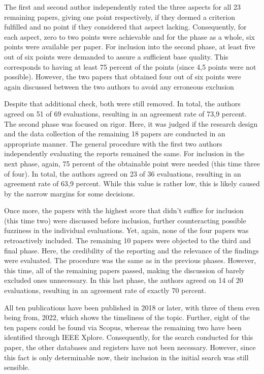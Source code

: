 \documentclass[conference]{IEEEtran}
\begin{document}
The first and second author independently rated the three aspects for all 23 remaining papers, giving one point respectively, if they deemed a criterion fulfilled and no point if they considered that aspect lacking. Consequently, for each aspect, zero to two points were achievable and for the phase as a whole, six points were available per paper. For inclusion into the second phase, at least five out of six points were demanded to assure a sufficient base quality. This corresponds to having at least 75 percent of the points (since 4,5 points were not possible). However, the two papers that obtained four out of six points were again discussed between the two authors to avoid any erroneous exclusion

Despite that additional check, both were still removed. In total, the authors agreed on 51 of 69 evaluations, resulting in an agreement rate of 73,9 percent. The second phase was focused on rigor. Here, it was judged if the research design and the data collection of the remaining 18 papers are conducted in an appropriate manner. The general procedure with the first two authors independently evaluating the reports remained the same. For inclusion in the next phase, again, 75 percent of the obtainable point were needed (this time three of four). In total, the authors agreed on 23 of 36 evaluations, resulting in an agreement rate of 63,9 percent. While this value is rather low, this is likely caused by the narrow margins for some decisions. 

Once more, the papers with the highest score that didn’t suffice for inclusion (this time two) were discussed before inclusion, further counteracting possible fuzziness in the individual evaluations. Yet, again, none of the four papers was retroactively included. The remaining 10 papers were objected to the third and final phase. Here, the credibility of the reporting and the relevance of the findings were evaluated. The procedure was the same as in the previous phases. However, this time, all of the remaining papers passed, making the discussion of barely excluded ones unnecessary. In this last phase, the authors agreed on 14 of 20 evaluations, resulting in an agreement rate of exactly 70 percent. 


All ten publications have been published in 2018 or later, with three of them even being from, 2022, which shows the timeliness of the topic. Further, eight of the ten papers could be found via Scopus, whereas the remaining two have been identified through IEEE Xplore. Consequently, for the search conducted for this paper, the other databases and registers have not been necessary. However, since this fact is only determinable now, their inclusion in the initial search was still sensible.
\end{document}
